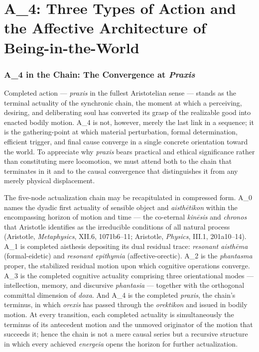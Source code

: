 \documentclass{article}
\begin{document}
\section{A\_4: Three Types of Action and the Affective Architecture of Being-in-the-World}

\subsubsection*{A\_4 in the Chain: The Convergence at \textit{Praxis}}

Completed action --- \textit{praxis} in the fullest Aristotelian sense --- stands as the terminal actuality of the synchronic chain, the moment at which a perceiving, desiring, and deliberating soul has converted its grasp of the realizable good into enacted bodily motion. A\_4 is not, however, merely the last link in a sequence; it is the gathering-point at which material perturbation, formal determination, efficient trigger, and final cause converge in a single concrete orientation toward the world. To appreciate why \textit{praxis} bears practical and ethical significance rather than constituting mere locomotion, we must attend both to the chain that terminates in it and to the causal convergence that distinguishes it from any merely physical displacement.

The five-node actualization chain may be recapitulated in compressed form. A\_0 names the dyadic first actuality of sensible object and \textit{aisth\={e}tikon} within the encompassing horizon of motion and time --- the co-eternal \textit{kin\={e}sis} and \textit{chronos} that Aristotle identifies as the irreducible conditions of all natural process (Aristotle, \textit{Metaphysics}, XII.6, 1071b6--11; Aristotle, \textit{Physics}, III.1, 201a10--14). A\_1 is completed aisthesis depositing its dual residual trace: \textit{resonant aisth\={e}ma} (formal-eidetic) and \textit{resonant epithymia} (affective-orectic). A\_2 is the \textit{phantasma} proper, the stabilized residual motion upon which cognitive operations converge. A\_3 is the completed cognitive actuality comprising three orientational modes --- intellection, memory, and discursive \textit{phantasia} --- together with the orthogonal committal dimension of \textit{doxa}. And A\_4 is the completed \textit{praxis}, the chain's terminus, in which \textit{orexis} has passed through the \textit{orektikon} and issued in bodily motion. At every transition, each completed actuality is simultaneously the terminus of its antecedent motion and the unmoved originator of the motion that succeeds it; hence the chain is not a mere causal series but a recursive structure in which every achieved \textit{energeia} opens the horizon for further actualization.
\end{document}
